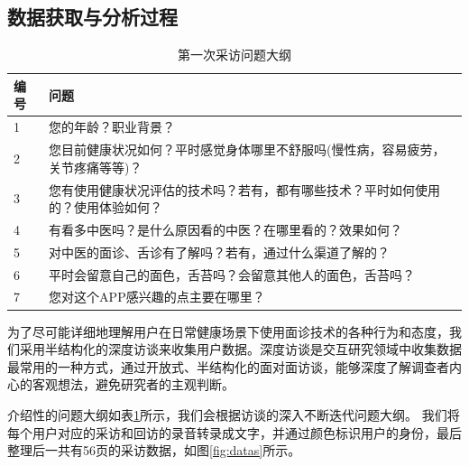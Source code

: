 


\subsection{数据获取与分析过程}
\begin{table}[h]
    \begin{tabular}{ll}
        \toprule
        编号 & 问题 \\
        \midrule
        1  & 您的年龄？职业背景？   \\
        2  & 您目前健康状况如何？平时感觉身体哪里不舒服吗(慢性病，容易疲劳，关节疼痛等等)？   \\
        3  &  您有使用健康状况评估的技术吗？若有，都有哪些技术？平时如何使用的？使用体验如何？  \\
        4  & 有看多中医吗？是什么原因看的中医？在哪里看的？效果如何？   \\
        5   & 对中医的面诊、舌诊有了解吗？若有，通过什么渠道了解的？   \\
        6  & 平时会留意自己的面色，舌苔吗？会留意其他人的面色，舌苔吗？\\
        7   & 您对这个APP感兴趣的点主要在哪里？\\
        \bottomrule
    \end{tabular}
    \caption{第一次采访问题大纲}
    \label{tab:inteview_questions}
\end{table}

为了尽可能详细地理解用户在日常健康场景下使用面诊技术的各种行为和态度，我们采用半结构化的深度访谈来收集用户数据\cite{DiciccoThe}。深度访谈是交互研究领域中收集数据最常用的一种方式，通过开放式、半结构化的面对面访谈，能够深度了解调查者内心的客观想法，避免研究者的主观判断。

介绍性的问题大纲如表\ref{tab:inteview_questions}所示，我们会根据访谈的深入不断迭代问题大纲。
我们将每个用户对应的采访和回访的录音转录成文字，并通过颜色标识用户的身份，最后整理后一共有56页的采访数据，如图\ref{fig:datas}所示。

